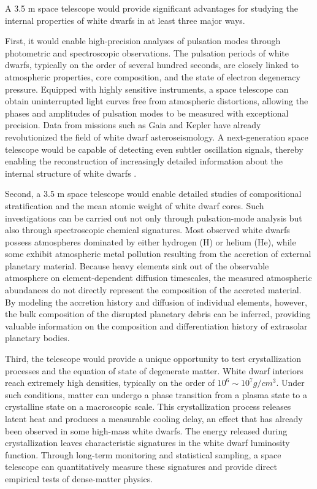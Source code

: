 A 3.5 m space telescope would provide significant advantages for studying the internal properties of white dwarfs in at least three major ways.

First, it would enable high-precision analyses of pulsation modes through photometric and spectroscopic observations. The pulsation periods of white dwarfs, typically on the order of several hundred seconds, are closely linked to atmospheric properties, core composition, and the state of electron degeneracy pressure. Equipped with highly sensitive instruments, a space telescope can obtain uninterrupted light curves free from atmospheric distortions, allowing the phases and amplitudes of pulsation modes to be measured with exceptional precision. Data from missions such as Gaia and Kepler have already revolutionized the field of white dwarf asteroseismology. A next-generation space telescope would be capable of detecting even subtler oscillation signals, thereby enabling the reconstruction of increasingly detailed information about the internal structure of white dwarfs \cite{corsico2022}.

Second, a 3.5 m space telescope would enable detailed studies of compositional stratification and the mean atomic weight of white dwarf cores. Such investigations can be carried out not only through pulsation-mode analysis but also through spectroscopic chemical signatures. 
Most observed white dwarfs possess atmospheres dominated by either hydrogen (H) or helium (He), while some exhibit atmospheric metal pollution resulting from the accretion of external planetary material. Because heavy elements sink out of the observable atmosphere on element-dependent diffusion timescales, the measured atmospheric abundances do not directly represent the composition of the accreted material. By modeling the accretion history and diffusion of individual elements, however, the bulk composition of the disrupted planetary debris can be inferred, providing valuable information on the composition and differentiation history of extrasolar planetary bodies.

Third, the telescope would provide a unique opportunity to test crystallization processes and the equation of state of degenerate matter. White dwarf interiors reach extremely high densities, typically on the order of $10^6 \sim 10^7 g/cm^3$. Under such conditions, matter can undergo a phase transition from a plasma state to a crystalline state on a macroscopic scale. This crystallization process releases latent heat and produces a measurable cooling delay, an effect that has already been observed in some high-mass white dwarfs. The energy released during crystallization leaves characteristic signatures in the white dwarf luminosity function. Through long-term monitoring and statistical sampling, a space telescope can quantitatively measure these signatures and provide direct empirical tests of dense-matter physics.

